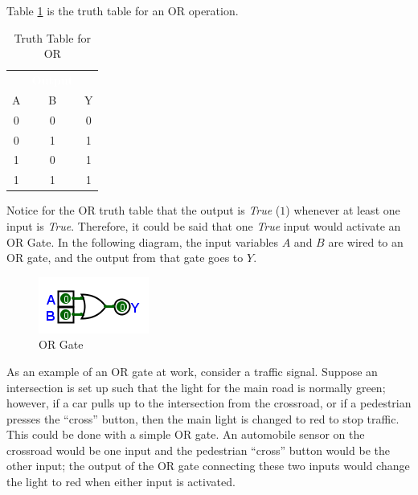 Table \ref{BF:tab:truth_table_for_or} is the truth table for an \textsf{OR}  operation.

\begin{table}[H]
  \sffamily
  \newcommand{\head}[1]{\textcolor{white}{\textbf{#1}}}    
  \begin{center}
    \begin{tabular}{ccc} 
      \rowcolor{black!75}
      \multicolumn{2}{c}{\head{Inputs}} & \head{Output} \\
      A & B & Y \\
      \hline
      0 & 0 & 0 \\
      0 & 1 & 1 \\
      1 & 0 & 1 \\
      1 & 1 & 1 
    \end{tabular}
  \end{center}
  \caption{Truth Table for OR}
  \label{BF:tab:truth_table_for_or}
\end{table}

Notice for the \textsf{OR} truth table that the output is \emph{True} ($ 1 $) whenever at least one input is \emph{True}. Therefore, it could be said that one \emph{True} input would activate an \textsf{OR} Gate. In the following diagram, the input variables $ A $ and $ B $ are wired to an \textsf{OR}  gate, and the output from that gate goes to $ Y $. 

\begin{figure}[H]
	\centering
	\includegraphics[width=\maxwidth{.95\linewidth}]{gfx/04_03}
	\caption{OR Gate}
	\label{fig:04_03}
\end{figure}

As an example of an \textsf{OR} gate at work, consider a traffic signal. Suppose an intersection is set up such that the light for the main road is normally green; however, if a car pulls up to the intersection from the crossroad, or if a pedestrian presses the ``cross'' button, then the main light is changed to red to stop traffic. This could be done with a simple \textsf{OR} gate. An automobile sensor on the crossroad would be one input and the pedestrian ``cross'' button would be the other input; the output of the \textsf{OR}  gate connecting these two inputs would change the light to red when either input is activated.

